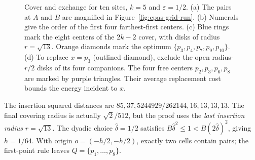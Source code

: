 \documentclass[a4paper,12pt]{article}
\numberwithin{equation}{section}
\begin{document}
\begin{figure}[!htbp]
\begin{minipage}[t]{.49\textwidth}
\end{minipage}\par\smallskip
{}

\caption[Five of ten sites: cover and exchange]{Cover and exchange for ten sites, $k=5$ and
$\varepsilon=1/2$. (a) The pairs at $A$ and $B$ are magnified in Figure~\ref{fig:epas-grid-run}.
(b) Numerals give the order of the first four farthest-first centers. (c) Blue rings mark the
eight centers of the $2k-2$ cover, with disks of radius $r=\sqrt{13}$. Orange diamonds mark
the optimum $\{p_3,p_4,p_7,p_9,p_{10}\}$. (d) To replace $x=p_3$ (outlined diamond),
exclude the open radius-$r/2$ disks of its four companions. The four free centers
$p_2,p_3,p_6,p_8$ are marked by purple triangles. Their average replacement cost bounds
the energy incident to $x$.}
\label{fig:epas-cover-run}
\end{figure}

The insertion squared distances are
$85,\allowbreak37,\allowbreak5244929/262144,\allowbreak16,\allowbreak13,\allowbreak13,\allowbreak13$.
The final covering radius is actually $\sqrt{2}/512$, but the proof uses the \emph{last insertion
radius} $r=\sqrt{13}$. The dyadic choice $\widehat\delta=1/2$ satisfies
$B\widehat\delta^2\le1<B(2\widehat\delta)^2$, giving $h=1/64$. With origin $o=(-h/2,-h/2)$,
exactly two cells contain pairs; the first-point rule leaves $Q=\{p_1,\ldots,p_8\}$.
\end{document}
